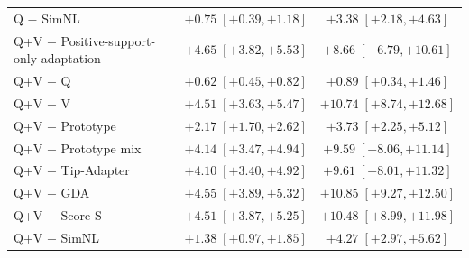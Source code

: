 \begin{table}[tp]
\begin{tabular*}{\textwidth}{@{\extracolsep{\fill}}lcc@{}}
Q $-$ SimNL & $+0.75\;[+0.39,+1.18]$ & $+3.38\;[+2.18,+4.63]$ \\
Q+V $-$ Positive-support-only adaptation & $+4.65\;[+3.82,+5.53]$ & $+8.66\;[+6.79,+10.61]$ \\
Q+V $-$ Q & $+0.62\;[+0.45,+0.82]$ & $+0.89\;[+0.34,+1.46]$ \\
Q+V $-$ V & $+4.51\;[+3.63,+5.47]$ & $+10.74\;[+8.74,+12.68]$ \\
Q+V $-$ Prototype & $+2.17\;[+1.70,+2.62]$ & $+3.73\;[+2.25,+5.12]$ \\
Q+V $-$ Prototype mix & $+4.14\;[+3.47,+4.94]$ & $+9.59\;[+8.06,+11.14]$ \\
Q+V $-$ Tip-Adapter & $+4.10\;[+3.40,+4.92]$ & $+9.61\;[+8.01,+11.32]$ \\
Q+V $-$ GDA & $+4.55\;[+3.89,+5.32]$ & $+10.85\;[+9.27,+12.50]$ \\
Q+V $-$ Score S & $+4.51\;[+3.87,+5.25]$ & $+10.48\;[+8.99,+11.98]$ \\
Q+V $-$ SimNL & $+1.38\;[+0.97,+1.85]$ & $+4.27\;[+2.97,+5.62]$ \\
\bottomrule
\end{tabular*}
\end{table}

